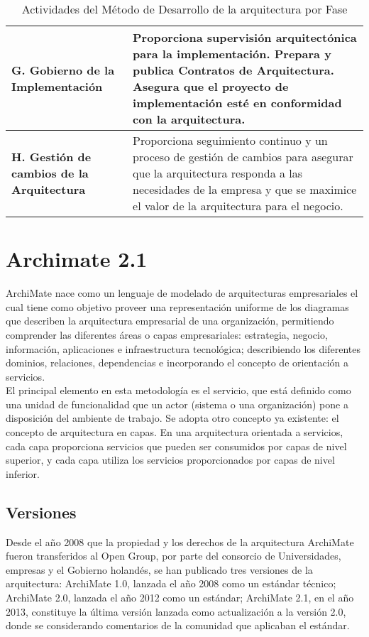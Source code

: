 \begin{table}[H]
\begin{tabular}{p{3.5cm}p{8.5cm}}
   		\textbf{G. Gobierno de la Implementación\index{Implementación}} & Proporciona supervisión arquitectónica para la implementación. Prepara y publica Contratos de Arquitectura. Asegura que el proyecto de implementación esté en conformidad con la arquitectura. \\ \hline
   		\textbf{H. Gestión de cambios de la Arquitectura} & Proporciona seguimiento continuo y un proceso de gestión de cambios para asegurar que la arquitectura responda a las necesidades de la empresa y que se maximice el valor de la arquitectura para el negocio. \\
   		\bottomrule
   	\end{tabular}
   	\captionsetup{width=.95\textwidth}
   	\caption{Actividades del Método de Desarrollo de la arquitectura por Fase \cite{ref4}}
   	\label{tabla2} 
  \end{table}

\section{Archimate 2.1}
ArchiMate nace como un lenguaje de modelado de arquitecturas empresariales el cual tiene como objetivo proveer una representación uniforme de los diagramas que describen la arquitectura empresarial de una organización, permitiendo comprender las diferentes áreas o capas empresariales: estrategia, negocio, información, aplicaciones e infraestructura tecnológica; describiendo los diferentes dominios, relaciones, dependencias e incorporando el concepto de orientación a servicios. \cite{ref9} \\

El principal elemento en esta metodología es el servicio, que está definido como una unidad de funcionalidad que un actor (sistema o una organización) pone a disposición del ambiente de trabajo. Se adopta otro concepto ya existente: el concepto de arquitectura en capas. En una arquitectura orientada a servicios, cada capa proporciona servicios que pueden ser consumidos por capas de nivel superior, y cada capa utiliza los servicios proporcionados por capas de nivel inferior. \\
  
  \subsection{Versiones}
  Desde el año 2008 que la propiedad y los derechos de la arquitectura ArchiMate fueron transferidos al Open Group, por parte del consorcio de Universidades, empresas y el Gobierno holandés, se han publicado tres versiones de la arquitectura: ArchiMate 1.0, lanzada el año 2008 como un estándar técnico; ArchiMate 2.0, lanzada el año 2012 como un estándar; ArchiMate 2.1, en el año 2013, constituye la última versión lanzada como actualización a la versión 2.0, donde se considerando comentarios de la comunidad que aplicaban el estándar. \\
  
